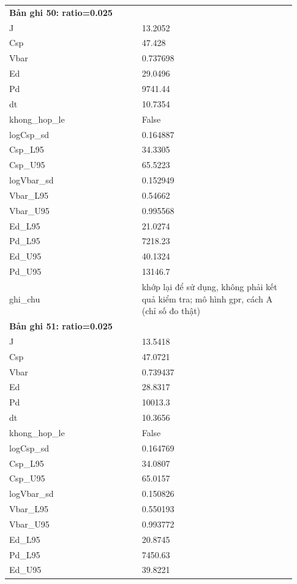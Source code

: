 \begin{longtable}{p{0.43\linewidth}p{0.50\linewidth}}
\midrule
\multicolumn{2}{p{0.95\linewidth}}{\textbf{Bản ghi 50: ratio=0.025}} \\
J & 13.2052 \\
Csp & 47.428 \\
Vbar & 0.737698 \\
Ed & 29.0496 \\
Pd & 9741.44 \\
dt & 10.7354 \\
khong\_\allowbreak hop\_\allowbreak le & False \\
logCsp\_\allowbreak sd & 0.164887 \\
Csp\_\allowbreak L95 & 34.3305 \\
Csp\_\allowbreak U95 & 65.5223 \\
logVbar\_\allowbreak sd & 0.152949 \\
Vbar\_\allowbreak L95 & 0.54662 \\
Vbar\_\allowbreak U95 & 0.995568 \\
Ed\_\allowbreak L95 & 21.0274 \\
Pd\_\allowbreak L95 & 7218.23 \\
Ed\_\allowbreak U95 & 40.1324 \\
Pd\_\allowbreak U95 & 13146.7 \\
ghi\_\allowbreak chu & khớp lại để sử dụng, không phải kết quả kiểm tra; mô hình gpr, cách A (chỉ số đo thật) \\
\midrule
\multicolumn{2}{p{0.95\linewidth}}{\textbf{Bản ghi 51: ratio=0.025}} \\
J & 13.5418 \\
Csp & 47.0721 \\
Vbar & 0.739437 \\
Ed & 28.8317 \\
Pd & 10013.3 \\
dt & 10.3656 \\
khong\_\allowbreak hop\_\allowbreak le & False \\
logCsp\_\allowbreak sd & 0.164769 \\
Csp\_\allowbreak L95 & 34.0807 \\
Csp\_\allowbreak U95 & 65.0157 \\
logVbar\_\allowbreak sd & 0.150826 \\
Vbar\_\allowbreak L95 & 0.550193 \\
Vbar\_\allowbreak U95 & 0.993772 \\
Ed\_\allowbreak L95 & 20.8745 \\
Pd\_\allowbreak L95 & 7450.63 \\
Ed\_\allowbreak U95 & 39.8221 \\

\end{longtable}
